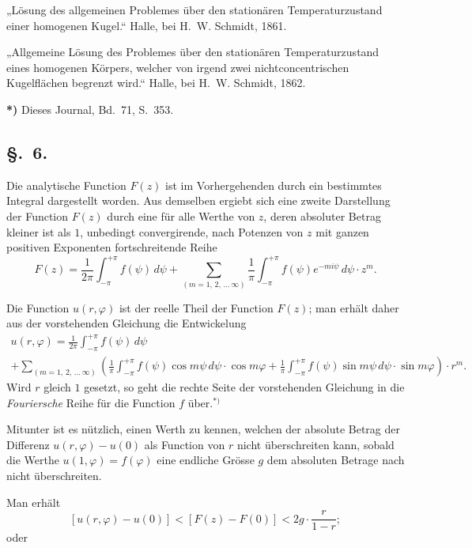 \documentclass{article}
\begin{document}
„Lösung des allgemeinen Problemes über den stationären Temperaturzustand einer homogenen Kugel.`` Halle, bei H.~W. Schmidt, 1861.

„Allgemeine Lösung des Problemes über den stationären Temperaturzustand eines homogenen Körpers, welcher von irgend zwei nichtconcentrischen Kugelflächen begrenzt wird.`` Halle, bei H.~W. Schmidt, 1862.

\textbf{*)} Dieses Journal, Bd.~71, S.~353.

\subsection*{§.~6.}

Die analytische Function $F(z)$ ist im Vorhergehenden durch ein bestimmtes Integral dargestellt worden. Aus demselben ergiebt sich eine zweite Darstellung der Function $F(z)$ durch eine für alle Werthe von $z$, deren absoluter Betrag kleiner ist als $1$, unbedingt convergirende, nach Potenzen von $z$ mit ganzen positiven Exponenten fortschreitende Reihe
\[
F(z) = \frac{1}{2\pi} \int_{-\pi}^{+\pi} f(\psi)\,d\psi + \sum_{(m=1, \, 2, \, \dots \, \infty)} \frac{1}{\pi} \int_{-\pi}^{+\pi} f(\psi) e^{-mi\psi}\,d\psi \cdot z^m.
\]

Die Function $u(r, \varphi)$ ist der reelle Theil der Function $F(z)$; man erhält daher aus der vorstehenden Gleichung die Entwickelung
\[
\begin{gathered}
u(r, \varphi) = \frac{1}{2\pi} \int_{-\pi}^{+\pi} f(\psi)\,d\psi \\
+ \sum_{(m=1, \, 2, \, \dots \, \infty)} \left( \frac{1}{\pi} \int_{-\pi}^{+\pi} f(\psi) \cos m\psi\,d\psi \cdot \cos m\varphi + \frac{1}{\pi} \int_{-\pi}^{+\pi} f(\psi) \sin m\psi\,d\psi \cdot \sin m\varphi \right) \cdot r^m.
\end{gathered}
\]
Wird $r$ gleich $1$ gesetzt, so geht die rechte Seite der vorstehenden Gleichung in die \emph{Fouriersche} Reihe für die Function $f$ über.${}^{*)}$

Mitunter ist es nützlich, einen Werth zu kennen, welchen der absolute Betrag der Differenz $u(r, \varphi) - u(0)$ als Function von $r$ nicht überschreiten kann, sobald die Werthe $u(1, \varphi) = f(\varphi)$ eine endliche Grösse $g$ dem absoluten Betrage nach nicht überschreiten.

Man erhält
\[
[u(r, \varphi) - u(0)] < [F(z) - F(0)] < 2g \cdot \frac{r}{1 - r};
\]
oder
\end{document}
